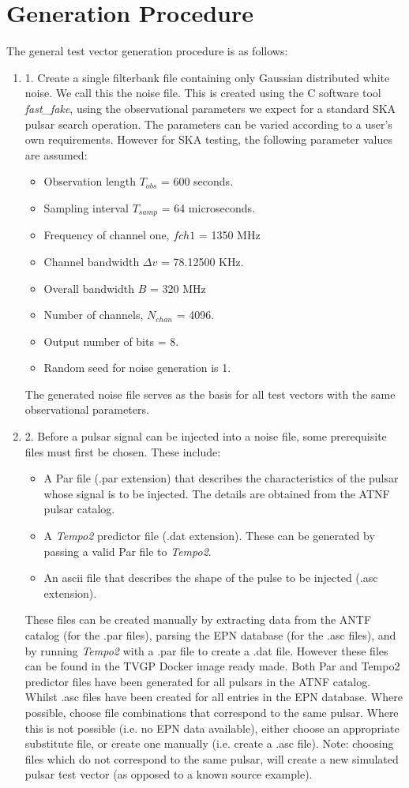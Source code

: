 \documentclass[preprint,authoryear,5p,twocolumn]{elsarticle_mod}
\begin{document}
\section{Generation Procedure}
The general test vector generation procedure is as follows: 
\begin{enumerate}
\item 1.	Create a single filterbank file containing only Gaussian distributed white noise. We call this the noise file. This is created using the C software tool \textit{fast\_fake}, using the observational parameters we expect for a standard SKA pulsar search operation. The parameters can be varied according to a user's own requirements.  However for SKA testing, the following parameter values are assumed: 
\begin{itemize}
\item Observation length $T_{obs}$ = 600 seconds. 
\item Sampling interval $T_{samp}$ = 64 microseconds. 
\item Frequency of channel one, $fch1$ = 1350 MHz 
\item Channel bandwidth $\Delta v$ = 78.12500 KHz. 
\item Overall bandwidth $B$ = 320 MHz 
\item Number of channels, $N_{chan}$ = 4096. 
\item Output number of bits = 8. 
\item Random seed for noise generation is 1. 
\end{itemize}
The generated noise file serves as the basis for all test vectors with the same observational parameters.
\item 2.	Before a pulsar signal can be injected into a noise file, some prerequisite files must first be chosen. These include: 
\begin{itemize}
\item A Par file (.par extension) that describes the characteristics of the pulsar whose signal is to be injected. The details are obtained from the ATNF pulsar catalog. 
\item A \textit{Tempo2} predictor file (.dat extension). These can be generated by passing a valid Par file to \textit{Tempo2}. 
\item An ascii file that describes the shape of the pulse to be injected (.asc extension). 
\end{itemize}
These files can be created manually by extracting data from the ANTF catalog (for the .par files), parsing the EPN database (for the .asc files), and by running \textit{Tempo2} with a .par file to create a .dat file. However these files can be found in the TVGP Docker image ready made. Both Par and Tempo2 predictor files have been generated for all pulsars in the ATNF catalog. Whilst .asc files have been created for all entries in the EPN database. Where possible, choose file combinations that correspond to the same pulsar. Where this is not possible (i.e. no EPN data available), either choose an appropriate substitute file, or create one manually (i.e. create a .asc file). Note: choosing files which do not correspond to the same pulsar, will create a new simulated pulsar test vector (as opposed to a known source example).

\end{enumerate}
\end{document}
